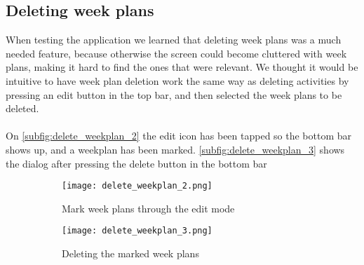 \subsection{Deleting week plans}
When testing the application we learned that deleting week plans was a much needed feature, because otherwise the screen could become cluttered with week plans, making it hard to find the ones that were relevant.
We thought it would be intuitive to have week plan deletion work the same way as deleting activities by pressing an edit button in the top bar, and then selected the week plans to be deleted.
\\\\
On \autoref{subfig:delete_weekplan_2} the edit icon has been tapped so the bottom bar shows up, and a weekplan has been marked. \autoref{subfig:delete_weekplan_3} shows the dialog after pressing the delete button in the bottom bar
\begin{figure}[H]
    \begin{subfigure}{0.5\textwidth}
    \texttt{[image: delete\_weekplan\_2.png]}
    \caption{Mark week plans through the edit mode}
    \label{subfig:delete_weekplan_2}
    \end{subfigure}
    \begin{subfigure}{0.5\textwidth}
        \texttt{[image: delete\_weekplan\_3.png]}
    \caption{Deleting the marked week plans}
    \label{subfig:delete_weekplan_3}
    \end{subfigure} 
    \caption{}
    \label{fig:delete_weekplan}
\end{figure}